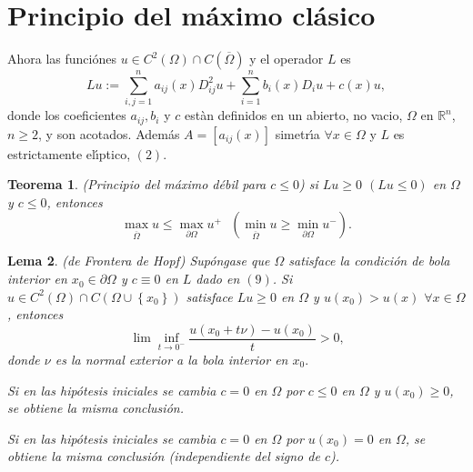 \documentclass{article}
\newtheorem{theorem}{Teorema}
\newtheorem{lemma}[theorem]{Lema}
\begin{document}
\section{Principio del m\'{a}ximo cl\'{a}sico}

Ahora las funci\'{o}nes $u\in C^{2}\left( \Omega \right) \cap C\left( 
\overline{\Omega }\right) $ y el operador $L$ es 
\begin{equation}
Lu:=\sum_{i,j=1}^{n}a_{ij}\left( x\right)
D_{ij}^{2}u+\sum_{i=1}^{n}b_{i}\left( x\right) D_{i}u+c\left( x\right) u, 
\tag{9}
\end{equation}
donde los coeficientes $a_{ij},b_{i}$ y $c$ est\`{a}n definidos en un
abierto, no vacio, $\Omega $ en $\mathbb{R}^{n}$, $n\geq 2$, y son acotados.
Adem\'{a}s $A=\left[ a_{ij}\left( x\right) \right] $ simetr\'{\i}a $\forall
x\in \Omega $ y $L$ es estrictamente el\'{\i}ptico, $\left( 2\right) $.

\begin{theorem}
(Principio del m\'{a}ximo d\'{e}bil para $c\leq 0$) si $Lu\geq 0$ $\left(
Lu\leq 0\right) $ en $\Omega $ y $c\leq 0$, entonces 
\begin{equation*}
\max_{\overline{\Omega }}u\leq \max_{\partial \Omega }u^{+}\text{ \ }\left(
\min_{\overline{\Omega }}u\geq \min_{\partial \Omega }u^{-}\right) .
\end{equation*}
\end{theorem}

\begin{lemma}
(de Frontera de Hopf) Sup\'{o}ngase que $\Omega $ satisface la condici\'{o}n
de bola interior en $x_{0}\in \partial \Omega $ y $c\equiv 0$ en $L$ dado en 
$\left( 9\right) $. Si $u\in C^{2}\left( \Omega \right) \cap C\left( \Omega
\cup \left\{ x_{0}\right\} \right) $ satisface $Lu\geq 0$ en $\Omega $ y $%
u\left( x_{0}\right) >u\left( x\right) $ $\forall x\in \Omega $, entonces 
\begin{equation*}
\lim \inf_{t\rightarrow 0^{-}}\frac{u\left( x_{0}+t\nu \right) -u\left(
x_{0}\right) }{t}>0\text{,}
\end{equation*}
donde $\nu $ es la normal exterior a la bola interior en $x_{0}.$

Si en las hip\'{o}tesis iniciales se cambia $c=0$ en $\Omega $ por $c\leq 0$
en $\Omega $ y $u\left( x_{0}\right) \geq 0$, se obtiene la misma
conclusi\'{o}n.

Si en las hip\'{o}tesis iniciales se cambia $c=0$ en $\Omega $ por $u\left(
x_{0}\right) =0$ en $\Omega $, se obtiene la misma conclusi\'{o}n
(independiente del signo de $c$).
\end{lemma}
\end{document}
